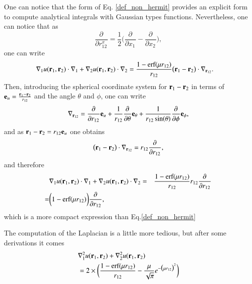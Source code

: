 \documentclass[aip,jcp,reprint,noshowkeys,superscriptaddress]{revtex4-1}
\newcommand{\deriv}[3]{\frac{\partial^{#3} #1}{\partial {#2}^{#3}}}
\newcommand{\br}[0]{{\bf {r}}}
\newcommand{\bri}[1]{{\bf r}_{#1}}
\begin{document}
One can notice that the form of Eq. \eqref{def_non_hermit} provides an explicit form to compute analytical integrals with Gaussian types functions. 
Nevertheless, one can notice that as 
\begin{equation}
 \deriv{}{r_{12}^x}{} = \frac{1}{2} \bigg( \deriv{}{x_1}{} - \deriv{}{x_2}{} \bigg),
\end{equation}
one can write 
\begin{equation}
 \begin{aligned}
 \label{eq:nabla_i_nabla0}
& \nabla_1 u(\br{}_1,\br{}_2) \cdot \nabla_1 + \nabla_2 u(\br{}_1,\br{}_2) \cdot \nabla_2 = \frac{1 - \text{erf}(\mu r_{12})}{r_{12}} \big( \br{}_1 - \br{}_2 \big) \cdot \nabla_{\br{}_{12}}.
 \end{aligned}
\end{equation}
Then, introducing the spherical coordinate system for $\br{}_1 - \br{}_2$ in terms of ${\bf e}_u= \frac{\br{}_1 - \br{}_2}{r_{12}}$ and the angle $\theta$ and $\phi$, one can write 
\begin{equation}
 \nabla_{\br{}_{12}} = \deriv{}{r_{12}}{} {\bf e}_u + \frac{1}{r_{12}} \deriv{}{\theta}{} {\bf e}_{\theta} + \frac{1}{r_{12} \sin(\theta)} \deriv{}{\phi}{} {\bf e}_\phi,
\end{equation}
and as $\br{}_1 - \br{}_2 = r_{12} {\bf e}_u$ one obtains
\begin{equation}
 \big( \br{}_1 - \br{}_2 \big) \cdot \nabla_{\br{}_{12}} = r_{12} \deriv{}{r_{12}}{},
\end{equation}
and therefore 
\begin{equation}
 \begin{aligned}
 \label{eq:nabla_i_nabla1}
& \nabla_1 u(\br{}_1,\br{}_2) \cdot \nabla_1 + \nabla_2 u(\br{}_1,\br{}_2) \cdot \nabla_2 = & \frac{1 - \text{erf}(\mu r_{12})}{r_{12}} r_{12} \deriv{}{r_{12}}{} \\
 = & \bigg( 1 - \text{erf}(\mu r_{12})\bigg) \deriv{}{r_{12}}{},
 \end{aligned}
\end{equation}
which is a more compact expression than Eq.\eqref{def_non_hermit}

The computation of the Laplacian is a little more tedious, but after some derivations it comes  
\begin{equation}
 \begin{aligned}
 \label{eq:d2_x1_2}
 &\nabla_1^2 u(\bri{1},\bri{2}) + \nabla_2^2u(\bri{1},\bri{2})\\ 
 & = 2 \times \bigg( \frac{1 - \text{erf}(\mu r_{12})}{r_{12}} - \frac{\mu}{\sqrt{\pi}} e^{-\big(\mu r_{12} \big)^2}  \bigg)
 \end{aligned}
\end{equation}
\end{document}

